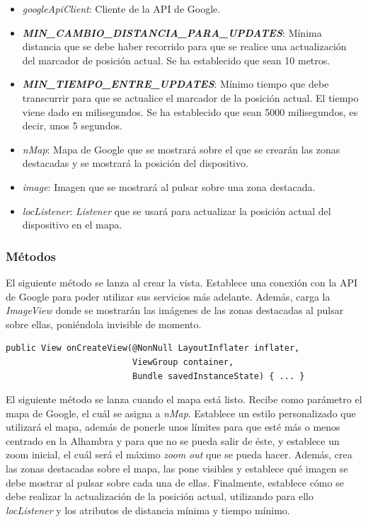 \documentclass[11pt,a4paper]{article}
\begin{document}
\begin{itemize}
    \item \textit{googleApiClient}: Cliente de la API de Google.
    \item \textit{\textbf{MIN\_CAMBIO\_DISTANCIA\_PARA\_UPDATES}}: Mínima distancia que se debe haber recorrido para que se realice una
    actualización del marcador de posición actual. Se ha establecido que sean 10 metros.
    \item \textit{\textbf{MIN\_TIEMPO\_ENTRE\_UPDATES}}: Mínimo tiempo que debe transcurrir para que se actualice el marcador de
    la posición actual. El tiempo viene dado en milisegundos. Se ha establecido que sean 5000 milisegundos, es decir, unos 5 segundos.
    \item \textit{nMap}: Mapa de Google que se mostrará  sobre el que se crearán las zonas destacadas y se mostrará la posición del
    dispositivo.
    \item \textit{image}: Imagen que se mostrará al pulsar sobre una zona destacada.
    \item \textit{locListener}: \textit{Listener} que se usará para actualizar la posición actual del dispositivo en el mapa.
\end{itemize}

\subsubsection{Métodos}

El siguiente método se lanza al crear la vista. Establece una conexión con la API de Google para poder utilizar sus servicios más adelante.
Además, carga la \textit{ImageView} donde se mostrarán las imágenes de las zonas destacadas al pulsar sobre ellas, poniéndola invisible
de momento.

\begin{lstlisting}
public View onCreateView(@NonNull LayoutInflater inflater,
                         ViewGroup container,
                         Bundle savedInstanceState) { ... }
\end{lstlisting}

El siguiente método se lanza cuando el mapa está listo. Recibe como parámetro el mapa de Google, el cuál se asigna a \textit{nMap}. Establece
un estilo personalizado que utilizará el mapa, además de ponerle unos límites para que esté más o menos centrado en la Alhambra y para que
no se pueda salir de éste, y establece un zoom inicial, el cuál será el máximo \textit{zoom out} que se pueda hacer. Además, crea las
zonas destacadas sobre el mapa, las pone visibles y establece qué imagen se debe mostrar al pulsar sobre cada una de ellas. Finalmente,
establece cómo se debe realizar la actualización de la posición actual, utilizando para ello \textit{locListener} y los
atributos de distancia mínima y tiempo mínimo.
\end{document}
